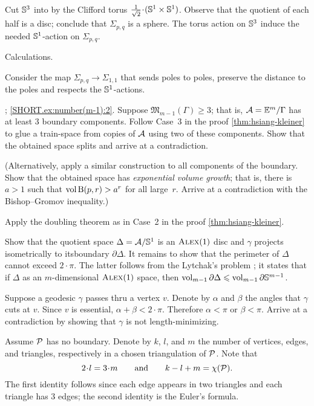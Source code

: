 Cut $\mathbb{S}^3$ into by the Clifford torus $\tfrac1{\sqrt2}\cdot (\SSS^1\times \SSS^1)$.
Observe that the quotient of each half is a disc;
conclude that $\Sigma_{p,q}$ is a sphere.
The torus action on $\mathbb{S}^3$ induce the needed $\mathbb{S}^1$-action on $\Sigma_{p,q}$.

 Calculations.

Consider the map $\Sigma_{p,q}\to\Sigma_{1,1}$ that sends poles to poles,
preserve the distance to the poles and respects the $\mathbb{S}^1$-actions.

\parbf{\ref{ex:number(m-1)}};
\ref{SHORT.ex:number(m-1):2}.
Suppose $\mathfrak{M}_{m-1}(\Gamma)\ge 3$;
that is, $\mathcal{A}=\mathbb{E}^m/\Gamma$ has at least 3 boundary components.
Follow Case~3 in the proof \ref{thm:hsiang-kleiner} to glue a train-space from copies of $\mathcal{A}$ using two of these components.
Show that the obtained space splits and arrive at a contradiction.

(Alternatively, apply a similar construction to all components of the boundary.
Show that the obtained space has {}\emph{exponential volume growth};
that is, there is $a>1$ such that $\operatorname{\rm vol}\nolimits \mathrm{B}{}(p,r)>a^r$ for all large~$r$.
Arrive at a contradiction with the Bishop--Gromov inequality.)

Apply the doubling theorem as in Case~2 in the proof \ref{thm:hsiang-kleiner}.

Show that the quotient space $\Delta=\mathcal{A}/\mathbb{S}^1$ is an $\textsc{Alex}(1)$ disc and $\gamma$ projects isometrically to itsboundary $\partial\Delta$.
It remains to show that the perimeter of $\Delta$ cannot exceed $2\cdot\pi$.
The latter follows from the Lytchak's problem \cite[3.3.5]{petrunin:survey};
it states that if $\Delta$ as an $m$-dimensional $\textsc{Alex}(1)$ space, then $\operatorname{\rm vol}\nolimits_{m-1}\partial \Delta\leqslant \operatorname{\rm vol}\nolimits_{m-1}\partial \mathbb{S}^{m-1}$.

Suppose a geodesic $\gamma$ passes thru a vertex $v$.
Denote by $\alpha$ and $\beta$ the angles that $\gamma$ cuts at $v$.
Since $v$ is essential, $\alpha+\beta<2\cdot\pi$.
Therefore $\alpha<\pi$ or $\beta<\pi$.
Arrive at a contradiction by showing that $\gamma$ is not length-minimizing.

Assume $\mathcal{P}$ has no boundary.
Denote by $k$, $l$, and $m$ the number of vertices, edges, and triangles, respectively in a chosen triangulation of $\mathcal{P}$.
Note that
\[2\cdot l=3\cdot m
\qquad\text{and}\qquad
k-l+m=\chi(\spc{P}).\]
The first identity follows since each edge appears in two triangles and each triangle has 3 edges;
the second identity is the Euler's formula.

